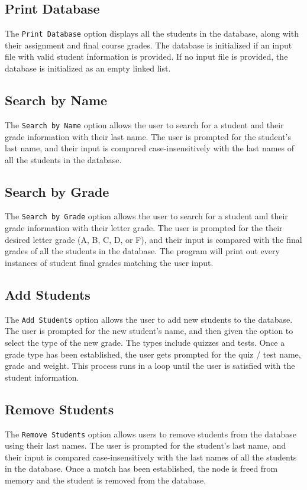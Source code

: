 \documentclass[usletter, 12pt]{article}
\begin{document}
        \subsection{Print Database} The \texttt{Print Database} option displays
        all the students in the database, along with their assignment and final
        course grades. The database is initialized if an input file with valid
        student information is provided. If no input file is provided, the
        database is initialized as an empty linked list.

        \subsection{Search by Name} The \texttt{Search by Name} option allows
        the user to search for a student and their grade information with their
        last name. The user is prompted for the student's last name, and their
        input is compared case-insensitively with the last names of all the
        students in the database.

        \subsection{Search by Grade} The \texttt{Search by Grade} option allows
        the user to search for a student and their grade information with their
        letter grade. The user is prompted for the their desired letter grade
        (A, B, C, D, or F), and their input is compared with the final grades
        of all the students in the database. The program will print out every
        instances of student final grades matching the user input.

        \subsection{Add Students} The \texttt{Add Students} option allows the
        user to add new students to the database. The user is prompted for the
        new student's name, and then given the option to select the type of the
        new grade. The types include quizzes and tests. Once a grade type has
        been established, the user gets prompted for the quiz / test name,
        grade and weight. This process runs in a loop until the user is
        satisfied with the student information.

        \subsection{Remove Students} The \texttt{Remove Students} option allows
        users to remove students from the database using their last names. The
        user is prompted for the student's last name, and their input is
        compared case-insensitively with the last names of all the students in
        the database. Once a match has been established, the node is freed from
        memory and the student is removed from the database.
\end{document}
